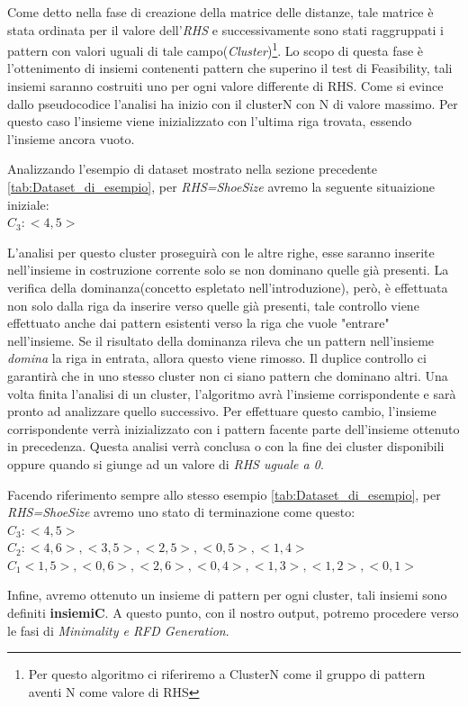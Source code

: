 Come detto nella fase di creazione della matrice delle distanze, tale matrice è stata ordinata per il valore dell'\emph{RHS} e successivamente sono stati raggruppati i pattern con valori uguali di tale campo(\emph{Cluster})\footnote{Per questo algoritmo ci riferiremo a ClusterN come il gruppo di pattern aventi N come valore di RHS }.
Lo scopo di questa fase è l'ottenimento di insiemi contenenti pattern che superino il test di Feasibility, tali insiemi saranno costruiti uno per ogni valore differente di RHS.
Come si evince dallo pseudocodice l'analisi ha inizio con il clusterN con N di valore massimo.
Per questo caso l'insieme viene inizializzato con l'ultima riga trovata, essendo l'insieme ancora vuoto.
\begin{center}
	Analizzando l'esempio di dataset mostrato nella sezione precedente \ref{tab:Dataset_di_esempio}, per \emph{RHS=ShoeSize} avremo la seguente situaizione iniziale:\\
	$C_3: {<4,5>}$\\
\end{center}
L'analisi per questo cluster proseguirà con le altre righe, esse saranno inserite nell'insieme in costruzione corrente solo se non dominano quelle già presenti. La verifica della dominanza(concetto espletato nell'introduzione), però, è effettuata non solo dalla riga da inserire verso quelle già presenti, tale controllo viene effettuato anche dai pattern esistenti verso la riga che vuole "entrare" nell'insieme. Se il risultato della dominanza rileva che un pattern nell'insieme \emph{domina} la riga in entrata, allora questo viene rimosso.
Il duplice controllo ci garantirà che in uno stesso cluster non ci siano pattern che dominano altri.
Una volta finita l'analisi di un cluster, l'algoritmo avrà l'insieme corrispondente e sarà pronto ad analizzare quello successivo. Per effettuare questo cambio, l'insieme corrispondente verrà inizializzato con i pattern facente parte dell'insieme ottenuto in precedenza.
Questa analisi verrà conclusa o con la fine dei cluster disponibili oppure quando si giunge ad un valore di \emph{RHS uguale a 0}.
\begin{center}
	Facendo riferimento sempre allo stesso esempio \ref{tab:Dataset_di_esempio}, per \emph{RHS=ShoeSize} avremo uno stato di terminazione come questo:\\
	$C_3: {<4,5>}$\\
	$C_2: {<4,6>, <3,5>, <2,5>, <0,5>, <1,4>}$\\
	$C_1 {<1,5>, <0,6>, <2,6>, <0,4>, <1,3>, <1,2>, <0,1>}$\\
\end{center}
Infine, avremo ottenuto un insieme di pattern per ogni cluster, tali insiemi sono definiti \textbf{insiemiC}.
A questo punto, con il nostro output, potremo procedere verso le fasi di \emph{Minimality e RFD Generation}.